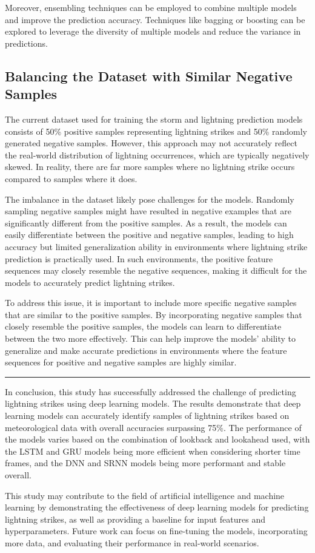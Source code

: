 Moreover, ensembling techniques can be employed to combine multiple models and improve the prediction accuracy. Techniques like bagging or boosting can be explored to leverage the diversity of multiple models and reduce the variance in predictions.

\subsection{Balancing the Dataset with Similar Negative Samples}

The current dataset used for training the storm and lightning prediction models consists of 50\% positive samples representing lightning strikes and 50\% randomly generated negative samples. However, this approach may not accurately reflect the real-world distribution of lightning occurrences, which are typically negatively skewed. In reality, there are far more samples where no lightning strike occurs compared to samples where it does.

The imbalance in the dataset likely pose challenges for the models. Randomly sampling negative samples might have resulted in negative examples that are significantly different from the positive samples. As a result, the models can easily differentiate between the positive and negative samples, leading to high accuracy but limited generalization ability in environments where lightning strike prediction is practically used. In such environments, the positive feature sequences may closely resemble the negative sequences, making it difficult for the models to accurately predict lightning strikes.

To address this issue, it is important to include more specific negative samples that are similar to the positive samples. By incorporating negative samples that closely resemble the positive samples, the models can learn to differentiate between the two more effectively. This can help improve the models' ability to generalize and make accurate predictions in environments where the feature sequences for positive and negative samples are highly similar.
\newline

\newpage
\hrule
\vspace{0.4cm}

In conclusion, this study has successfully addressed the challenge of predicting lightning strikes using deep learning models. The results demonstrate that deep learning models can accurately identify samples of lightning strikes based on meteorological data with overall accuracies surpassing 75\%. The performance of the models varies based on the combination of lookback and lookahead used, with the LSTM and GRU models being more efficient when considering shorter time frames, and the DNN and SRNN models being more performant and stable overall.

This study may contribute to the field of artificial intelligence and machine learning by demonstrating the effectiveness of deep learning models for predicting lightning strikes, as well as providing a baseline for input features and hyperparameters. Future work can focus on fine-tuning the models, incorporating more data, and evaluating their performance in real-world scenarios.

